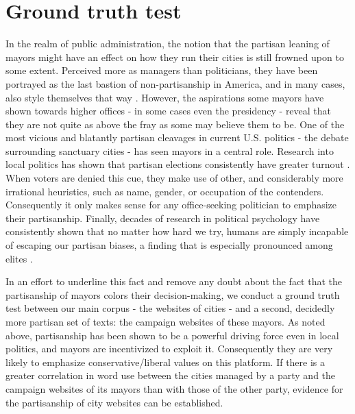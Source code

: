 \documentclass[11pt]{article}
\begin{document}
\section{Ground truth test}
In the realm of public administration, the notion that the partisan leaning of mayors might have an effect on how they run their cities is still frowned upon to some extent. Perceived more as managers than politicians, they have been portrayed as the last bastion of non-partisanship in America, and in many cases, also style themselves that way \citep{Dovere2018}. However, the aspirations some mayors have shown towards higher offices - in some cases even the presidency - reveal that they are not quite as above the fray as some may believe them to be. One of the most vicious and blatantly partisan cleavages in current U.S. politics - the debate surrounding sanctuary cities - has seen mayors in a central role. Research into local politics has shown that partisan elections consistently have greater turnout \citep{Schaffner2001}. When voters are denied this cue, they make use of other, and considerably more irrational heuristics, such as name, gender, or occupation of the contenders. Consequently it only makes sense for any office-seeking politician to emphasize their partisanship. Finally, decades of research in political psychology have consistently shown that no matter how hard we try, humans are simply incapable of escaping our partisan biases, a finding that is especially pronounced among elites \citep{Hatemi2011}.

In an effort to underline this fact and remove any doubt about the fact that the partisanship of mayors colors their decision-making, we conduct a ground truth test between our main corpus - the websites of cities - and a second, decidedly more partisan set of texts: the campaign websites of these mayors. As noted above, partisanship has been shown to be a powerful driving force even in local politics, and mayors are incentivized to exploit it. Consequently they are very likely to emphasize conservative/liberal values on this platform. If there is a greater correlation in word use between the cities managed by a party and the campaign websites of its mayors than with those of the other party, evidence for the partisanship of city websites can be established.
\end{document}
